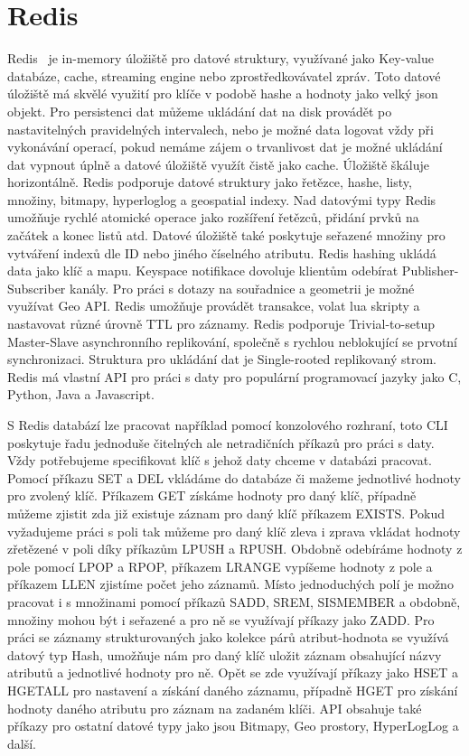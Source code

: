 \documentclass[czech,master,dept460,male,csharp,cpdeclaration]{diploma}
\begin{document}
	\section{Redis} \label{lab-redis}
	
	Redis~\cite{redis} je in-memory úložiště pro datové struktury, využívané jako Key-value databáze, cache, streaming engine nebo zprostředkovávatel zpráv. Toto datové úložiště má skvělé využití pro klíče v podobě hashe a hodnoty jako velký json objekt. Pro persistenci dat můžeme ukládání dat na disk provádět po nastavitelných pravidelných intervalech, nebo je možné data logovat vždy při vykonávání operací, pokud nemáme zájem o trvanlivost dat je možné ukládání dat vypnout úplně a datové úložiště využít čistě jako cache. Úložiště škáluje horizontálně. Redis podporuje datové struktury jako řetězce, hashe, listy, množiny, bitmapy, hyperloglog a geospatial indexy. Nad datovými typy Redis umožňuje rychlé atomické operace jako rozšíření řetězců, přidání prvků na začátek a konec listů atd. Datové úložiště také poskytuje seřazené množiny pro vytváření indexů dle ID nebo jiného číselného atributu. Redis hashing ukládá data jako klíč a mapu. Keyspace notifikace dovoluje klientům odebírat Publisher-Subscriber kanály. Pro práci s dotazy na souřadnice a geometrii je možné využívat Geo API. Redis umožňuje provádět transakce, volat lua skripty a nastavovat různé úrovně TTL pro záznamy. Redis podporuje Trivial-to-setup Master-Slave asynchronního replikování, společně s rychlou neblokující se prvotní synchronizaci. Struktura pro ukládání dat je Single-rooted replikovaný strom. Redis má vlastní API pro práci s daty pro populární programovací jazyky jako C, Python, Java a Javascript.
	
	S Redis databází lze pracovat například pomocí konzolového rozhraní, toto CLI~\cite{rediscli} poskytuje řadu jednoduše čitelných ale netradičních příkazů pro práci s daty. Vždy potřebujeme specifikovat klíč s jehož daty chceme v databázi pracovat. Pomocí příkazu SET a DEL vkládáme  do databáze či mažeme jednotlivé hodnoty pro zvolený klíč. Příkazem GET získáme hodnoty pro daný klíč, případně můžeme zjistit zda již existuje záznam pro daný klíč příkazem EXISTS. Pokud vyžadujeme práci s poli tak můžeme pro daný klíč zleva i zprava vkládat hodnoty zřetězené v poli díky příkazům LPUSH a RPUSH. Obdobně odebíráme hodnoty z pole pomocí LPOP a RPOP, příkazem LRANGE vypíšeme hodnoty z pole a příkazem LLEN zjistíme počet jeho záznamů. Místo jednoduchých polí je možno pracovat i s množinami pomocí příkazů SADD, SREM, SISMEMBER a obdobně, množiny mohou být i seřazené a pro ně se využívají příkazy jako ZADD. Pro práci se záznamy strukturovaných jako kolekce párů atribut-hodnota se využívá datový typ Hash, umožňuje nám pro daný klíč uložit záznam obsahující názvy atributů a jednotlivé hodnoty pro ně. Opět se zde využívají příkazy jako HSET a HGETALL pro nastavení a získání daného záznamu, případně HGET pro získání hodnoty daného atributu pro záznam na zadaném klíči. API obsahuje také příkazy pro ostatní datové typy jako jsou Bitmapy, Geo prostory, HyperLogLog a další.
	
\end{document}
